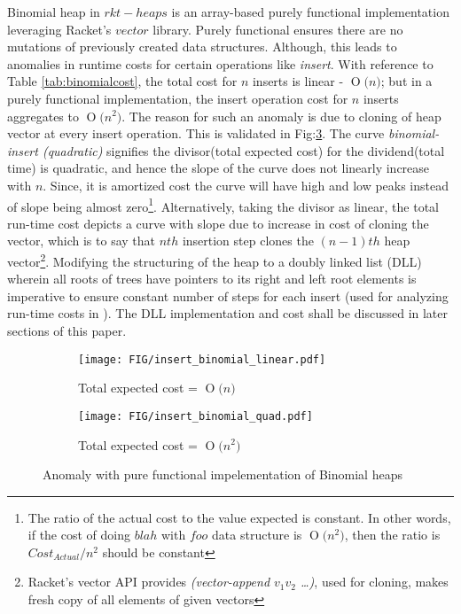 \documentclass{llncs}
\newcommand{\BigO}[1]{\ensuremath{\operatorname{O}\bigl(#1\bigr)}}
\begin{document}
Binomial heap in $rkt-heaps$ is an array-based purely functional implementation leveraging Racket's $vector$ library. Purely functional ensures there are no mutations of previously created data structures. Although, this leads to anomalies in runtime costs for certain operations like \emph{insert}. With reference to Table \ref{tab:binomialcost}, the total cost for $n$ inserts is linear - \BigO{n}; but in a purely functional implementation, the insert operation cost for $n$ inserts aggregates to \BigO{n^2}. The reason for such an anomaly is due to cloning of heap vector at every insert operation. This is validated in Fig:\ref{fig:bino_anomaly}. The curve \emph{binomial-insert (quadratic)} signifies the divisor(total expected cost) for the dividend(total time) is quadratic, and hence the slope of the curve does not linearly increase with $n$. Since, it is amortized cost the curve will have high and low peaks instead of slope being almost zero\footnote{The ratio of the actual cost to the value expected is constant. In other words, if the cost of doing $blah$ with $foo$ data structure is \BigO{n^2}, then the ratio is $Cost_{Actual} / n^2$ should be constant}. Alternatively, taking the divisor as linear, the total run-time cost depicts a curve with slope due to increase in cost of cloning the vector, which is to say that $nth$ insertion step clones the $(n-1)th$ heap vector\footnote{Racket's vector API provides \emph{(vector-append $v_1 v_2$ \dots)}, used for cloning, makes fresh copy of all elements of given vectors}. Modifying the structuring of the heap to a doubly linked list (DLL) wherein all roots of trees have pointers to its right and left root elements is imperative to ensure constant number of steps for each insert (used for analyzing run-time costs in \cite{kozen1992design}). The DLL implementation and cost shall be discussed in later sections of this paper. 

\begin{figure}
	\begin{subfigure}{0.5\textwidth}
		\centering
		\texttt{[image: FIG/insert\_binomial\_linear.pdf]}
		\caption{Total expected cost = \BigO{n}}
		\label{fig:bino_anomaly_linear}
	\end{subfigure}%
	\begin{subfigure}{0.5\textwidth}
		\centering
		\texttt{[image: FIG/insert\_binomial\_quad.pdf]}
		\caption{Total expected cost = \BigO{n^2}}
		\label{fig:bino_anomaly_quad}
	\end{subfigure}
	\caption{Anomaly with pure functional impelementation of Binomial heaps}
	\label{fig:bino_anomaly}
\end{figure}
\end{document}

